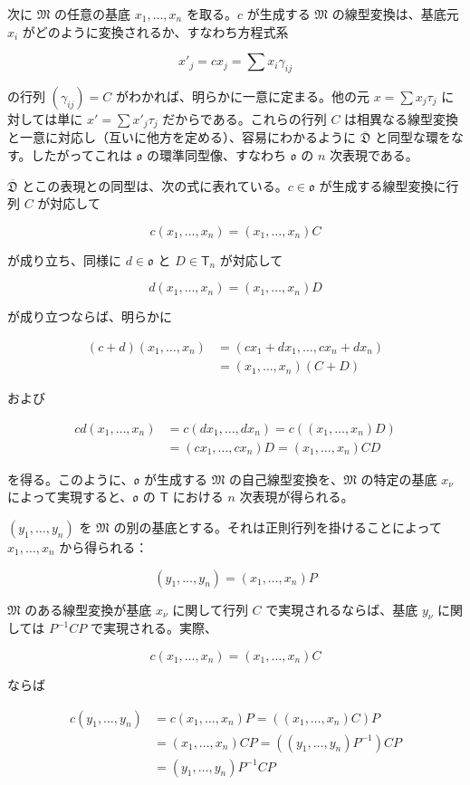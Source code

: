 次に $\mathfrak M$ の任意の基底 $x_1,\ldots,x_n$ を取る。$c$ が生成する $\mathfrak M$ の線型変換は、基底元 $x_i$ がどのように変換されるか、すなわち方程式系

\[
x'_j=cx_j=\sum x_i\gamma_{ij}
\]

の行列 $(\gamma_{ij})=C$ がわかれば、明らかに一意に定まる。他の元 $x=\sum x_j\tau_j$ に対しては単に $x'=\sum x'_j\tau_j$ だからである。これらの行列 $C$ は相異なる線型変換と一意に対応し（互いに他方を定める）、容易にわかるように $\overline{\mathfrak D}$ と同型な環をなす。したがってこれは $\mathfrak{o}$ の環準同型像、すなわち $\mathfrak{o}$ の $n$ 次表現である。

$\overline{\mathfrak D}$ とこの表現との同型は、次の式に表れている。$c\in\mathfrak{o}$ が生成する線型変換に行列 $C$ が対応して

\[
c(x_1,\ldots,x_n)=(x_1,\ldots,x_n)C
\]

が成り立ち、同様に $d\in\mathfrak{o}$ と $D\in\mathsf T_n$ が対応して

\[
d(x_1,\ldots,x_n)=(x_1,\ldots,x_n)D
\]

が成り立つならば、明らかに

\[
\begin{aligned}
(c+d)(x_1,\ldots,x_n)
&=(cx_1+dx_1,\ldots,cx_n+dx_n)\\
&=(x_1,\ldots,x_n)(C+D)
\end{aligned}
\]

および

\[
\begin{aligned}
cd(x_1,\ldots,x_n)
&=c(dx_1,\ldots,dx_n)=c((x_1,\ldots,x_n)D)\\
&=(cx_1,\ldots,cx_n)D=(x_1,\ldots,x_n)CD
\end{aligned}
\]

を得る。このように、$\mathfrak{o}$ が生成する $\mathfrak M$ の自己線型変換を、$\mathfrak M$ の特定の基底 $x_\nu$ によって実現すると、$\mathfrak{o}$ の $\mathsf T$ における $n$ 次表現が得られる。

$(y_1,\ldots,y_n)$ を $\mathfrak M$ の別の基底とする。それは正則行列を掛けることによって $x_1,\ldots,x_n$ から得られる：

\[(y_1,\ldots,y_n)=(x_1,\ldots,x_n)P\]

$\mathfrak M$ のある線型変換が基底 $x_\nu$ に関して行列 $C$ で実現されるならば、基底 $y_\nu$ に関しては $P^{-1}CP$ で実現される。実際、

\[c(x_1,\ldots,x_n)=(x_1,\ldots,x_n)C\]

ならば

\[
\begin{aligned}
c(y_1,\ldots,y_n)
&=c(x_1,\ldots,x_n)P=((x_1,\ldots,x_n)C)P\\
&=(x_1,\ldots,x_n)CP=((y_1,\ldots,y_n)P^{-1})CP\\
&=(y_1,\ldots,y_n)P^{-1}CP
\end{aligned}
\]

